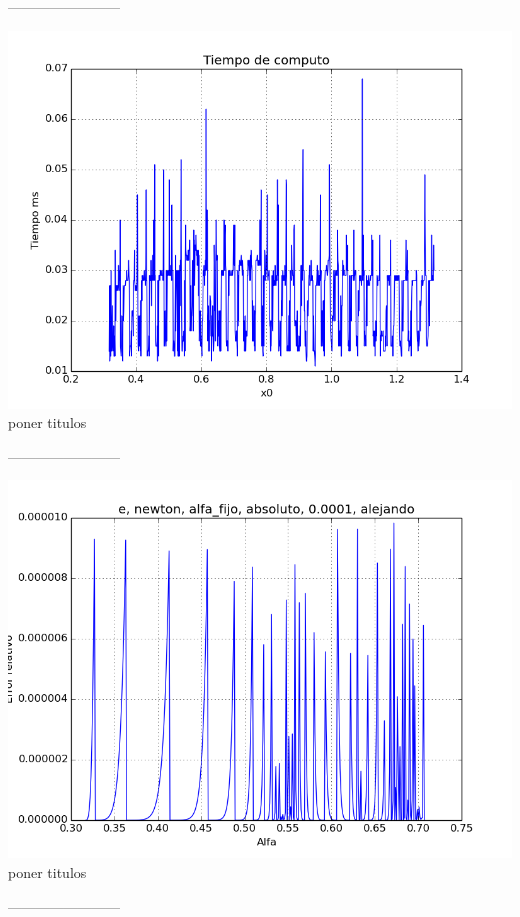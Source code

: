 ------------------------
\begin{center}
\includegraphics[scale=0.5]{graficos/tiempo-e-secante-alfa_fijo-absoluto-0.0001-alejando.png}\\
poner titulos
\end{center}
------------------------
\begin{center}
\includegraphics[scale=0.5]{graficos/relativo-e-newton-alfa_fijo-absoluto-0.0001-alejando.png}\\
poner titulos
\end{center}
------------------------
